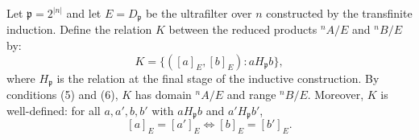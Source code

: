 Let $\mathfrak{p} = 2^{|n|}$ and let $E = D_\mathfrak{p}$ be the ultrafilter over $n$ constructed by the transfinite induction. Define the relation $K$ between the reduced products $^n A / E$ and $^n B / E$ by:
$$K = \{([a]_E, [b]_E) : a H_\mathfrak{p} b\},$$
where $H_\mathfrak{p}$ is the relation at the final stage of the inductive construction. By conditions (5) and (6), $K$ has domain $^n A / E$ and range $^n B / E$. Moreover, $K$ is well-defined: for all $a, a', b, b'$ with $a H_\mathfrak{p} b$ and $a' H_\mathfrak{p} b'$,
$$[a]_E = [a']_E \iff [b]_E = [b']_E.$$
